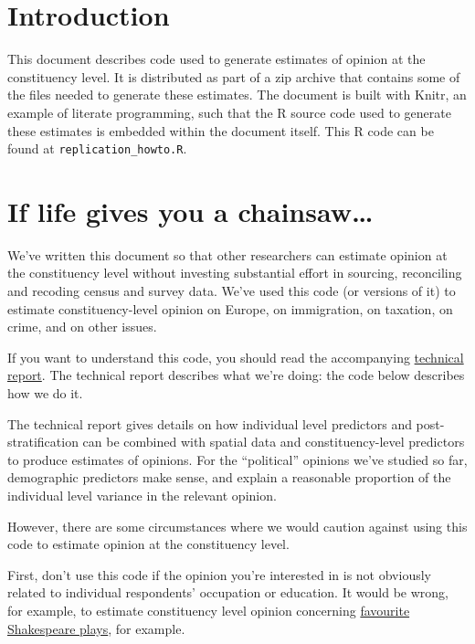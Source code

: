 \documentclass[12pt,twoside]{article}
\title{\myTitle}
\author{HLV}
\date{November 2014}
\begin{document}
\maketitle

\section{Introduction}\label{introduction}

This document describes code used to generate estimates of opinion at
the constituency level. It is distributed as part of a zip archive that
contains some of the files needed to generate these estimates. The
document is built with Knitr, an example of literate programming, such
that the R source code used to generate these estimates is embedded
within the document itself. This R code can be found at
\texttt{replication\_howto.R}.

\section{If life gives you a
chainsaw\ldots{}}\label{if-life-gives-you-a-chainsaw}

We've written this document so that other researchers can estimate
opinion at the constituency level without investing substantial effort
in sourcing, reconciling and recoding census and survey data. We've used
this code (or versions of it) to estimate constituency-level opinion on
Europe, on immigration, on taxation, on crime, and on other issues.

If you want to understand this code, you should read the accompanying
\href{http://constituencyopinion.org.uk/wp-content/uploads/2014/10/constituency-estimates-technical-report.pdf}{technical
report}. The technical report describes what we're doing: the code below
describes how we do it.

The technical report gives details on how individual level predictors
and post-stratification can be combined with spatial data and
constituency-level predictors to produce estimates of opinions. For the
``political'' opinions we've studied so far, demographic predictors make
sense, and explain a reasonable proportion of the individual level
variance in the relevant opinion.

However, there are some circumstances where we would caution against
using this code to estimate opinion at the constituency level.

First, don't use this code if the opinion you're interested in is not
obviously related to individual respondents' occupation or education. It
would be wrong, for example, to estimate constituency level opinion
concerning
\href{https://yougov.co.uk/news/2012/05/08/britains-favourite-shakespeare/}{favourite
Shakespeare plays}, for example.
\end{document}
